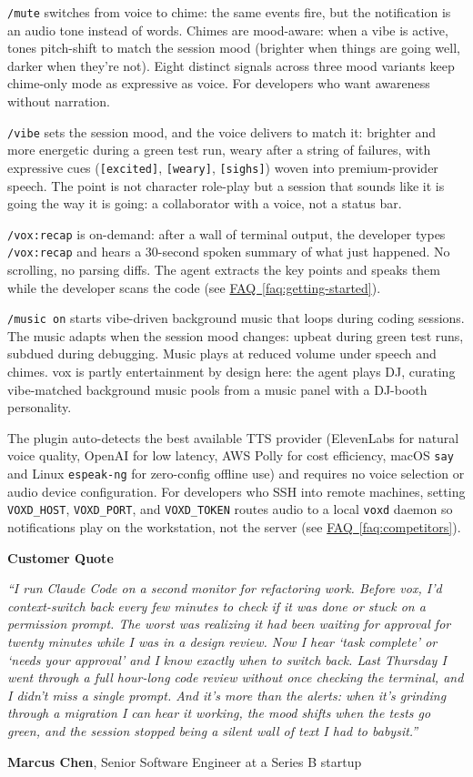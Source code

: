 \documentclass[11pt,letterpaper]{article}
\newcommand{\prsection}[1]{%
  \vspace{1em}%
  {\large\bfseries\color{SectionBlue}#1}%
  \vspace{0.3em}\par%
}
\newcommand{\faqref}[1]{\hyperref[#1]{FAQ~\ref*{#1}}}
\begin{document}
\texttt{/mute} switches from voice to chime: the same events fire, but
the notification is an audio tone instead of words. Chimes are mood-aware:
when a vibe is active, tones pitch-shift to match the session mood (brighter
when things are going well, darker when they're not). Eight distinct signals
across three mood variants keep chime-only mode as expressive as voice. For
developers who want awareness without narration.

\texttt{/vibe} sets the session mood, and the voice delivers to match it:
brighter and more energetic during a green test run, weary after a string of
failures, with expressive cues (\texttt{[excited]}, \texttt{[weary]},
\texttt{[sighs]}) woven into premium-provider speech. The point is not
character role-play but a session that sounds like it is going the way it is
going: a collaborator with a voice, not a status bar.

\texttt{/vox:recap} is on-demand: after a wall of terminal output, the developer
types \texttt{/vox:recap} and hears a 30-second spoken summary of what just
happened. No scrolling, no parsing diffs. The agent extracts the key points
and speaks them while the developer scans the code
(see \faqref{faq:getting-started}).

\texttt{/music on} starts vibe-driven background music that loops during coding
sessions. The music adapts when the session mood changes: upbeat during green
test runs, subdued during debugging. Music plays at reduced volume under speech
and chimes. vox is partly entertainment by design here: the agent plays
DJ, curating vibe-matched background music pools from a music panel with a
DJ-booth personality.

The plugin auto-detects the best available TTS provider (ElevenLabs for
natural voice quality, OpenAI for low latency, AWS Polly for cost efficiency,
macOS \texttt{say} and Linux \texttt{espeak-ng} for zero-config offline use)
and requires no voice selection or audio device configuration. For
developers who SSH into remote machines, setting \texttt{VOXD\_HOST},
\texttt{VOXD\_PORT}, and \texttt{VOXD\_TOKEN} routes audio to a local
\texttt{voxd} daemon so
notifications play on the workstation, not the server
(see \faqref{faq:competitors}).

\prsection{Customer Quote}

\begin{customerquote}
\textit{``I run Claude Code on a second monitor for refactoring work. Before
vox, I'd context-switch back every few minutes to check if it was done or
stuck on a permission prompt. The worst was realizing it had been waiting for
approval for twenty minutes while I was in a design review. Now I hear `task
complete' or `needs your approval' and I know exactly when to switch back.
Last Thursday I went through a full hour-long code review without once checking
the terminal, and I didn't miss a single prompt. And it's more than the
alerts: when it's grinding through a migration I can hear it working, the mood
shifts when the tests go green, and the session stopped being a silent wall of
text I had to babysit.''}

\raggedleft \textbf{Marcus Chen}, Senior Software Engineer at a Series B
startup
\end{customerquote}
\end{document}

